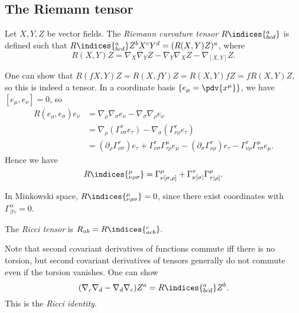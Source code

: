 \documentclass{jknotes}
\begin{document}
\subsection{The Riemann tensor}
\begin{defn}
    Let \(X,Y,Z\) be vector fields. The \emph{Riemann curvature tensor} \(R\indices{^a_{bcd}}\) is defined such that \(R\indices{^a_{bcd}}Z^bX^cY^d = (R(X,Y)Z)^a\), where
    \begin{equation}
        R(X,Y)Z = \nabla_X\nabla_YZ - \nabla_Y\nabla_XZ - \nabla_{[X,Y]}Z.
    \end{equation}
\end{defn}
One can show that \(R(fX,Y)Z = R(X,fY)Z = R(X,Y)fZ = fR(X,Y)Z\), so this is indeed a tensor. In a coordinate basis \(\left\{e_\mu = \pdv{x^\mu}\right\}\), we have \([e_\mu,e_\nu]=0\), so
\begin{align}
    R(e_\rho,e_\sigma)e_\nu &= \nabla_\rho\nabla_\sigma e_\nu - \nabla_\sigma\nabla_\rho e_\nu \\
                            &= \nabla_\rho(\Gamma^\tau_{\nu\sigma}e_\tau) - \nabla_\sigma(\Gamma^\tau_{\nu\rho}e_\tau) \\
                            &= (\partial_\rho \Gamma^\tau_{\nu\sigma})e_\tau + \Gamma^\tau_{\nu\sigma}\Gamma^\mu_{\tau\rho}e_\mu - (\partial_\sigma\Gamma^\tau_{\nu\rho})e_\tau - \Gamma^\tau_{\nu\rho}\Gamma^\mu_{\tau\sigma} e_\mu.
\end{align}
Hence we have
\begin{equation}
    R\indices{^\mu_{\nu\rho\sigma}} = \Gamma^\mu_{\nu[\sigma,\rho]} + \Gamma^\tau_{\nu[\sigma|}\Gamma^\mu_{\tau|\rho]}.
\end{equation}

In Minkowski space, \(R\indices{^\mu_{\nu\rho\sigma}} = 0\), since there exist coordinates with \(\Gamma^\alpha_{\beta\gamma}=0\).

\begin{defn}
    The \emph{Ricci tensor} is \(R_{ab} = R\indices{^c_{acb}}\).
\end{defn}

Note that second covariant derivatives of functions commute iff there is no torsion, but second covariant derivatives of tensors generally do not commute even if the torsion vanishes. One can show
\begin{equation}
    (\nabla_c\nabla_d-\nabla_d\nabla_c)Z^a = R\indices{^a_{bcd}}Z^b.
\end{equation}
This is the \emph{Ricci identity}.
\end{document}

